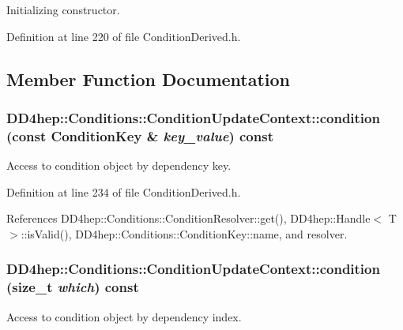 Initializing constructor. 

Definition at line 220 of file ConditionDerived.h.

\subsection{Member Function Documentation}
\hypertarget{class_d_d4hep_1_1_conditions_1_1_condition_update_context_a34d236304dba85a7e5542994f8274845}{
\subsubsection[{condition}]{ DD4hep::Conditions::ConditionUpdateContext::condition (const {\bf ConditionKey} \& {\em key\_\-value}) const}}
\label{class_d_d4hep_1_1_conditions_1_1_condition_update_context_a34d236304dba85a7e5542994f8274845}


Access to condition object by dependency key. 

Definition at line 234 of file ConditionDerived.h.

References DD4hep::Conditions::ConditionResolver::get(), DD4hep::Handle$<$ T $>$::isValid(), DD4hep::Conditions::ConditionKey::name, and resolver.\hypertarget{class_d_d4hep_1_1_conditions_1_1_condition_update_context_ad4afd5fa0bf63e1f79329bf35034d044}{
\subsubsection[{condition}]{ DD4hep::Conditions::ConditionUpdateContext::condition (size\_\-t {\em which}) const}}
\label{class_d_d4hep_1_1_conditions_1_1_condition_update_context_ad4afd5fa0bf63e1f79329bf35034d044}


Access to condition object by dependency index. 


